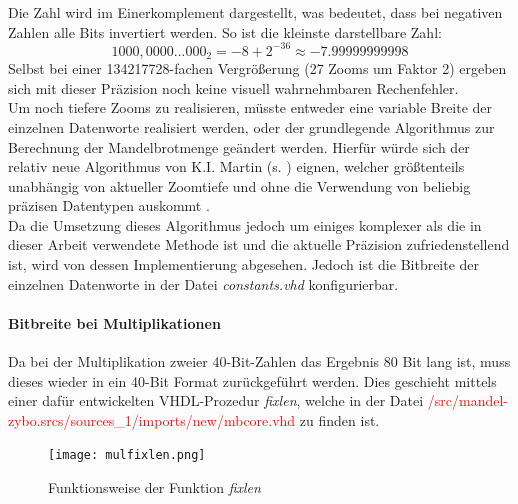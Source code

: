 \documentclass[a4paper,12pt,onesided]{report}
\begin{document}
Die Zahl wird im Einerkomplement dargestellt, was bedeutet, dass bei negativen Zahlen alle Bits invertiert werden. So ist die kleinste darstellbare Zahl:
\[1000,0000...000_2 = -8 + 2^{-36} \approx -7.99999999998 \]
Selbst bei einer 134217728-fachen Vergrößerung (27 Zooms um Faktor 2) ergeben sich mit dieser Präzision noch keine visuell wahrnehmbaren Rechenfehler.\\
Um noch tiefere Zooms zu realisieren, müsste entweder eine variable Breite der einzelnen Datenworte realisiert werden, oder der grundlegende Algorithmus zur Berechnung der Mandelbrotmenge geändert werden.
Hierfür würde sich der relativ neue Algorithmus von K.I. Martin (s. \cite{SUPERFRACTALTHINGMATHS}) eignen, welcher größtenteils unabhängig von aktueller Zoomtiefe und ohne die Verwendung von beliebig präzisen Datentypen auskommt \cite{SUPERFRACTALTHINGMATHS}.\\
Da die Umsetzung dieses Algorithmus jedoch um einiges komplexer als die in dieser Arbeit verwendete Methode ist und die aktuelle Präzision zufriedenstellend ist, wird von dessen Implementierung abgesehen.
Jedoch ist die Bitbreite der einzelnen Datenworte in der Datei \textit{constants.vhd} konfigurierbar.\\
\paragraph{Bitbreite bei Multiplikationen}
Da bei der Multiplikation zweier 40-Bit-Zahlen das Ergebnis 80 Bit lang ist, muss dieses wieder in ein 40-Bit Format zurückgeführt werden.
Dies geschieht mittels einer dafür entwickelten VHDL-Prozedur \textit{fixlen}, welche in der Datei \textcolor{red}{/src/mandel-zybo.srcs/sources\_1/imports/new/mbcore.vhd} zu finden ist.

\begin{figure}[H]
	\centering
	\texttt{[image: mulfixlen.png]}
	\caption{Funktionsweise der Funktion \textit{fixlen}}
	\label{fig:fixlen}
\end{figure}
\end{document}
